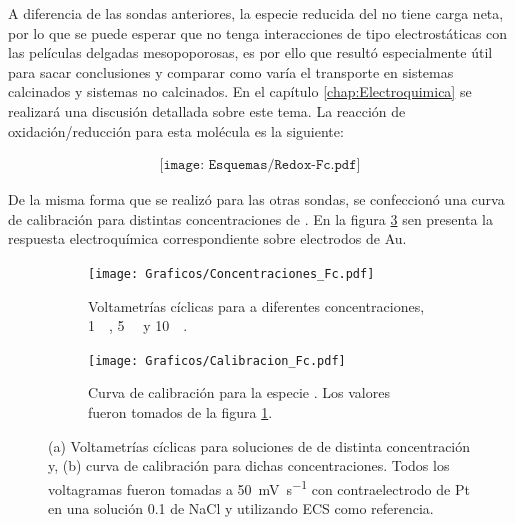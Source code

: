 { 	 	  A diferencia de las sondas anteriores, la especie reducida del \fc\space no tiene carga neta, por lo que se puede esperar que no tenga interacciones de tipo electrostáticas con las películas delgadas mesopoporosas, es por ello que resultó especialmente útil para sacar conclusiones y comparar como varía el transporte en sistemas calcinados y sistemas no calcinados. En el capítulo \ref{chap:Electroquimica} se realizará una discusión detallada sobre este tema. 
 	 	  La reacción de oxidación/reducción para esta molécula es la siguiente:
 	 	 			
 	 				 \begin{equation}
 	 	 				\begin{aligned}
 	 	 				\texttt{[image: Esquemas/Redox-Fc.pdf]}
 	 	 				\end{aligned}
 	 	 			 \end{equation}
 	 	  
 	 	 De la misma forma que se realizó para las otras sondas, se confeccionó una curva de calibración para distintas concentraciones de \fc\space. En la figura \ref{Fig:Fc} sen presenta la respuesta electroquímica correspondiente sobre electrodos de Au.
 	 				
		 		 \begin{figure}[ht]
		 	      \begin{subfigure}[t]{0.495\textwidth}
		          	\texttt{[image: Graficos/Concentraciones\_Fc.pdf]}
		         	\caption{Voltametrías cíclicas para \fc\space a diferentes concentraciones, \SI{1}{\milli\Molar}, \SI{5}{\milli\Molar} y \SI{10}{\milli\Molar}.}
		          	\label{fig:Fc_a}
		      		\end{subfigure}
		      	 \begin{subfigure}[t]{0.495\textwidth}
		          	\texttt{[image: Graficos/Calibracion\_Fc.pdf]}
		         	\caption{Curva de calibración para la especie \fc. Los valores fueron tomados de la figura \ref{fig:Fc_a}.}
		          	\label{fig:Fc_b}
		      		\end{subfigure}
		      	 \caption[Respuesta electroquímica para \fc]{(a) Voltametrías cíclicas para soluciones de \fc\space de distinta concentración y, (b) curva de calibración para dichas concentraciones. Todos los voltagramas fueron tomadas a \SI{50}{\milli\volt\per\second} con contraelectrodo de Pt en una solución \SI{0.1}{\Molar} de NaCl y utilizando ECS como referencia.}
		      	 \label{Fig:Fc}
	      		 \end{figure}

}
